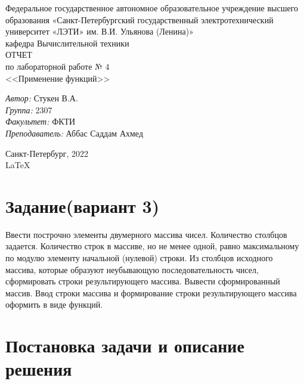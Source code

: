 \documentclass[a4paper,12pt]{report}
\begin{document}
 

\begin{titlepage} 

\begin{center} 

\large Федеральное государственное автономное образовательное учреждение высшего образования «Санкт-Петербургский государственный электротехнический университет «ЛЭТИ» им. В.И. Ульянова (Ленина)»\\
кафедра Вычислительной техники\\[5cm] 

\huge ОТЧЕТ\\ по лабораторной работе № 4\\[0.5cm] 
\large <<Применение функций>>\\[3.7cm]

\begin{minipage}{1\textwidth}
    \begin{flushleft}
        \emph{Автор:} Стукен В.А.\\
        \emph{Группа:} 2307\\
        \emph{Факультет:} ФКТИ\\
        \emph{Преподаватель:} Аббас Саддам Ахмед\\
    \end{flushleft}
\end{minipage}

\vfill

Санкт-Петербург, 2022\\
{\large \LaTeX}

\end{center}
\thispagestyle{empty}
\end{titlepage}

\section*{Задание(вариант 3)}
Ввести построчно элементы двумерного массива чисел. Количество столбцов задается. Количество строк в массиве, но не менее одной, равно максимальному по модулю элементу начальной (нулевой) строки. Из столбцов исходного массива, которые образуют неубывающую последовательность чисел, сформировать строки результирующего массива. Вывести сформированный массив. Ввод строки массива и формирование строки результирующего массива оформить в виде функций.

\section*{Постановка задачи и описание решения}
\par
\end{document}
